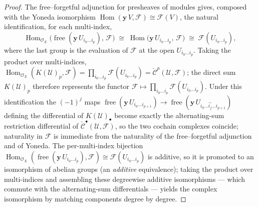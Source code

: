 \begin{proof}
  The free–forgetful adjunction for presheaves of modules gives, composed with the
  Yoneda isomorphism \(\operatorname{Hom}(\mathbf{y}\,V, \mathcal{F}) \cong
  \mathcal{F}(V)\), the natural identification, for each multi-index,
  \[
    \operatorname{Hom}_{\mathcal{O}_X}\bigl(
      \operatorname{free}(\mathbf{y}\,U_{i_0 \ldots i_p}),\, \mathcal{F}
    \bigr)
    \;\cong\;
    \operatorname{Hom}\bigl(\mathbf{y}\,U_{i_0 \ldots i_p},\,
      \mathcal{F}\bigr)
    \;\cong\;
    \mathcal{F}(U_{i_0 \ldots i_p}),
  \]
  where the last group is the evaluation of \(\mathcal{F}\) at the open
  \(U_{i_0 \ldots i_p}\). Taking the product over multi-indices,
  \(\operatorname{Hom}_{\mathcal{O}_X}(K(\mathcal{U})_p, \mathcal{F}) =
  \prod_{i_0 \ldots i_p} \mathcal{F}(U_{i_0 \ldots i_p}) =
  \check{\mathcal{C}}^p(\mathcal{U}, \mathcal{F})\); the direct sum
  \(K(\mathcal{U})_p\) therefore represents the functor \(\mathcal{F} \mapsto
  \prod_{i_0 \ldots i_p} \mathcal{F}(U_{i_0 \ldots i_p})\). Under this
  identification the \((-1)^j\) maps \(\operatorname{free}(\mathbf{y}\,U_{i_0
  \ldots i_{p+1}}) \to \operatorname{free}(\mathbf{y}\,U_{i_0 \ldots \widehat{i_j}
  \ldots i_{p+1}})\) defining the differential of \(K(\mathcal{U})_\bullet\) become
  exactly the alternating-sum restriction differential of
  \(\check{\mathcal{C}}^\bullet(\mathcal{U}, \mathcal{F})\), so the two cochain
  complexes coincide; naturality in \(\mathcal{F}\) is immediate from the
  naturality of the free–forgetful adjunction and of Yoneda. The per-multi-index
  bijection \(\operatorname{Hom}_{\mathcal{O}_X}(\operatorname{free}(\mathbf{y}\,
  U_{i_0 \ldots i_p}), \mathcal{F}) \cong \mathcal{F}(U_{i_0 \ldots i_p})\) is additive,
  so it is promoted to an isomorphism of abelian groups (an \emph{additive}
  equivalence); taking the product over multi-indices and assembling these degreewise
  additive isomorphisms — which commute with the alternating-sum differentials — yields
  the complex isomorphism by matching components degree by degree.
\end{proof}

